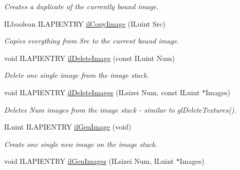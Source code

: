 \begin{DoxyCompactItemize}
\begin{DoxyCompactList}\small\item\em Creates a duplicate of the currently bound image. \end{DoxyCompactList}\item 
I\+Lboolean I\+L\+A\+P\+I\+E\+N\+T\+R\+Y \hyperlink{group__image__mgt_gaf0f3ef5b949468a12a4b49e0fb2cb3cb}{il\+Copy\+Image} (I\+Luint Src)
\begin{DoxyCompactList}\small\item\em Copies everything from Src to the current bound image. \end{DoxyCompactList}\item 
\hypertarget{group__image__mgt_ga74c70352949963d2b30c919662a65844}{void I\+L\+A\+P\+I\+E\+N\+T\+R\+Y \hyperlink{group__image__mgt_ga74c70352949963d2b30c919662a65844}{il\+Delete\+Image} (const I\+Luint Num)}\label{group__image__mgt_ga74c70352949963d2b30c919662a65844}

\begin{DoxyCompactList}\small\item\em Delete one single image from the image stack. \end{DoxyCompactList}\item 
\hypertarget{group__image__mgt_gab4346d371243537a7050e255f99c8b16}{void I\+L\+A\+P\+I\+E\+N\+T\+R\+Y \hyperlink{group__image__mgt_gab4346d371243537a7050e255f99c8b16}{il\+Delete\+Images} (I\+Lsizei Num, const I\+Luint $\ast$Images)}\label{group__image__mgt_gab4346d371243537a7050e255f99c8b16}

\begin{DoxyCompactList}\small\item\em Deletes Num images from the image stack -\/ similar to gl\+Delete\+Textures(). \end{DoxyCompactList}\item 
\hypertarget{group__image__mgt_ga056ebbb4dc5b18e027c555fcf39bd3c4}{I\+Luint I\+L\+A\+P\+I\+E\+N\+T\+R\+Y \hyperlink{group__image__mgt_ga056ebbb4dc5b18e027c555fcf39bd3c4}{il\+Gen\+Image} (void)}\label{group__image__mgt_ga056ebbb4dc5b18e027c555fcf39bd3c4}

\begin{DoxyCompactList}\small\item\em Create one single new image on the image stack. \end{DoxyCompactList}\item 
\hypertarget{group__image__mgt_ga2bd61fd22ff429363d44a4eaff3b064d}{void I\+L\+A\+P\+I\+E\+N\+T\+R\+Y \hyperlink{group__image__mgt_ga2bd61fd22ff429363d44a4eaff3b064d}{il\+Gen\+Images} (I\+Lsizei Num, I\+Luint $\ast$Images)}\label{group__image__mgt_ga2bd61fd22ff429363d44a4eaff3b064d}


\end{DoxyCompactItemize}
